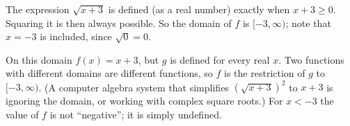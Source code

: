 The expression $\sqrt{x+3}$ is defined (as a real number) exactly when $x+3\ge0$. Squaring it is then always possible. So the domain of $f$ is $\boxed{[-3,\infty)}$; note that $x=-3$ is included, since $\sqrt0=0$.

On this domain $f(x)=x+3$, but $g$ is defined for every real $x$. Two functions with different domains are different functions, so $f$ is the restriction of $g$ to $[-3,\infty)$. (A computer algebra system that simplifies $\left(\sqrt{x+3}\right)^2$ to $x+3$ is ignoring the domain, or working with complex square roots.) For $x<-3$ the value of $f$ is not ``negative''; it is simply undefined.

